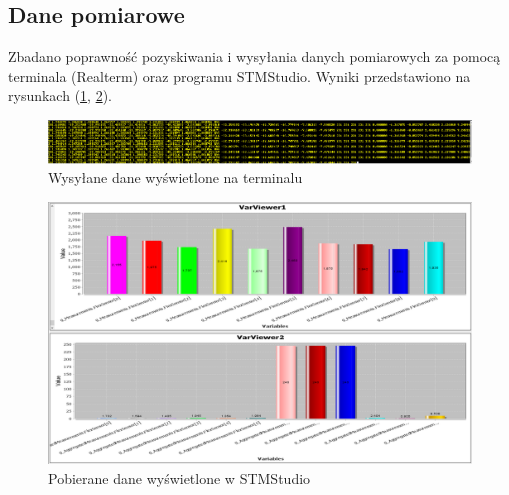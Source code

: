 \documentclass[12pt,a4paper]{article}
\begin{document}
\subsection{Dane pomiarowe}
Zbadano poprawność pozyskiwania i wysyłania danych pomiarowych za pomocą terminala (Realterm) oraz programu STMStudio. Wyniki przedstawiono na rysunkach (\ref{fig:term}, \ref{fig:stmstudio}).\\
\begin{figure}
\centering
\includegraphics[width=\textwidth]{./images/terminal.png}
\caption{Wysyłane dane wyświetlone na terminalu \label{fig:term}}
\end{figure}
\begin{figure}
\centering
\includegraphics[width=\textwidth]{./images/stmstudio.png}
\caption{Pobierane dane wyświetlone w STMStudio\label{fig:stmstudio}}
\end{figure}
\end{document}
